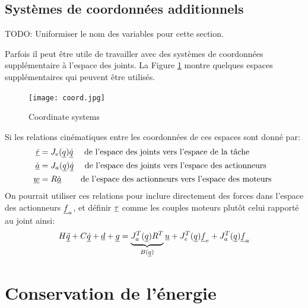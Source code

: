 \subsection{Systèmes de coordonnées additionnels}
\label{sec:coord}

TODO: Uniformiser le nom des variables pour cette section.

\newline
Parfois il peut être utile de travailler avec des systèmes de coordonnées supplémentaire à l'espace des joints. La Figure \ref{fig:coord} montre quelques espaces supplémentaires qui peuvent être utilisés. 
%
\begin{figure}[H]
	\centering
		\texttt{[image: coord.jpg]}
	\caption{Coordinate systems}%
	\label{fig:coord}
\end{figure}
%
Si les relations cinématiques entre les coordonnées de ces espaces sont donné par:
%
\begin{align}
\underline{\dot{r}}   &= J_e( \underline{q} ) \underline{\dot{q} }  \quad \text{ de l'espace des joints vers l'espace de la tâche   } \\
\underline{\dot{a}}   &= J_a( \underline{q} ) \underline{\dot{q} }  \quad \text{ de l'espace des joints vers l'espace des actionneurs } \\
\underline{w }        &= R              \underline{\dot{a} }  \quad\quad \text{ de l'espace des actionneurs vers l'espace des moteurs } 
\label{eq:coord_transform2}
\end{align}
%
%
On pourrait utiliser ces relations pour inclure directement des forces dans l'espace des actionneurs $\underline{f}_a$, et définir $\underline{\tau}$ comme les couples moteurs plutôt celui rapporté au joint ainsi:
\begin{align}
H \underline{\ddot{q}} + C \underline{\dot{q}} + \underline{d} + \underline{g} =  \underbrace{ J_a^T(\underline{q}) R^T }_{B(\underline{q})}  \underline{u} + J_e^T(\underline{q}) \underline{f}_e + J_a^T(\underline{q}) \underline{f}_a
\label{eq:manipulator_gen}
\end{align}


\newpage
\section{Conservation de l'énergie}

